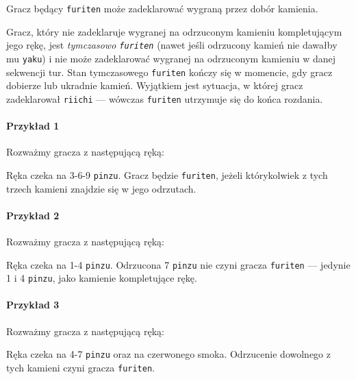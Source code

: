 Gracz będący \texttt{furiten} może zadeklarować wygraną przez dobór kamienia.

Gracz, który nie zadeklaruje wygranej na odrzuconym kamieniu kompletującym jego
rękę, jest \emph{tymczasowo \texttt{furiten}} (nawet jeśli odrzucony kamień nie
dawałby mu \texttt{yaku}) i nie może zadeklarować wygranej na odrzuconym
kamieniu w danej sekwencji tur.
Stan tymczasowego \texttt{furiten} kończy się w momencie, gdy gracz dobierze lub
ukradnie kamień.
Wyjątkiem jest sytuacja, w której gracz zadeklarował \texttt{riichi} --- wówczas
\texttt{furiten} utrzymuje się do końca rozdania.

\paragraph{Przykład 1}
Rozważmy gracza z następującą ręką:
\begin{center}
\end{center}
Ręka czeka na 3-6-9 \texttt{pinzu}.
Gracz będzie \texttt{furiten}, jeżeli którykolwiek z tych trzech kamieni
znajdzie się w jego odrzutach.

\paragraph{Przykład 2}
Rozważmy gracza z następującą ręką:
\begin{center}
\end{center}
Ręka czeka na 1-4 \texttt{pinzu}.
Odrzucona 7 \texttt{pinzu} nie czyni gracza \texttt{furiten} --- jedynie 1 i 4
\texttt{pinzu}, jako kamienie kompletujące rękę.

\paragraph{Przykład 3}
Rozważmy gracza z następującą ręką:
\begin{center}
\end{center}
Ręka czeka na 4-7 \texttt{pinzu} oraz na czerwonego smoka.
Odrzucenie dowolnego z tych kamieni czyni gracza \texttt{furiten}.
